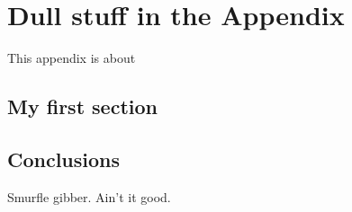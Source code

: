 \appendix
\dblspace

\chapter{Dull stuff in the Appendix}

This appendix is about

\section{My first section}
\label{sec:detail:myfirst}

\section{Conclusions}
\label{sec:detail:conclusions}

Smurfle gibber. Ain't it good.
